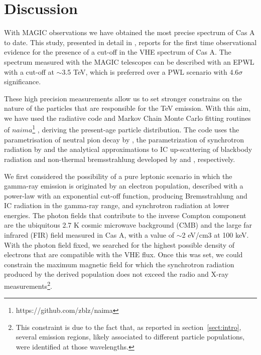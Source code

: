 \documentclass{PoS}
\begin{document}
\section{Discussion}

With MAGIC observations we have obtained the most precise spectrum of Cas A to date. This study, presented in detail in \cite{THE_PAPER}, reports for the first time observational evidence for the presence of a cut-off in the VHE spectrum of Cas A. The spectrum measured with the MAGIC telescopes can be described with an EPWL with a cut-off at $\sim$3.5 TeV, which is preferred over a PWL scenario with 4.6$\sigma$ significance. 

These high precision measurements allow us to set stronger constrains on the nature of the particles that are responsible for the TeV emission. With this aim, we have used the radiative code and Markov Chain Monte Carlo fitting routines of $naima$\footnote{https://github.com/zblz/naima} \cite{Zabalza_2015}, deriving the present-age particle distribution. The code uses the parametrisation of neutral pion decay by \cite{Kafexhiu_2014}, the parametrization of synchrotron radiation by \cite{NaimaSyn} and the analytical approximations to IC up-scattering of blackbody radiation and non-thermal bremsstrahlung developed by \cite{Khangulyan_2014} and \cite{Baring_1999}, respectively.

We first considered the possibility of a pure leptonic scenario in which the gamma-ray emission is originated by an electron population, described with a power-law with an exponential cut-off function, producing Bremsstrahlung and IC radiation in the gamma-ray range, and synchrotron radiation at lower energies. The photon fields that contribute to the inverse Compton component are the ubiquitous 2.7 K cosmic microwave background (CMB) and the large far infrared (FIR) field measured in Cas A, with a value of $\sim$2 eV/cm3 at 100 keV. 
With the photon field fixed, we searched for the highest possible density of electrons that are compatible with the VHE flux. Once this was set, we could constrain the maximum magnetic field for which the synchrotron radiation produced by the derived population does not exceed the radio and X-ray measurements\footnote{This constraint is due to the fact that, as reported in section~\ref{sect:intro}, several emission regions, likely associated to different particle populations, were identified at those wavelengths.}. 
\end{document}
